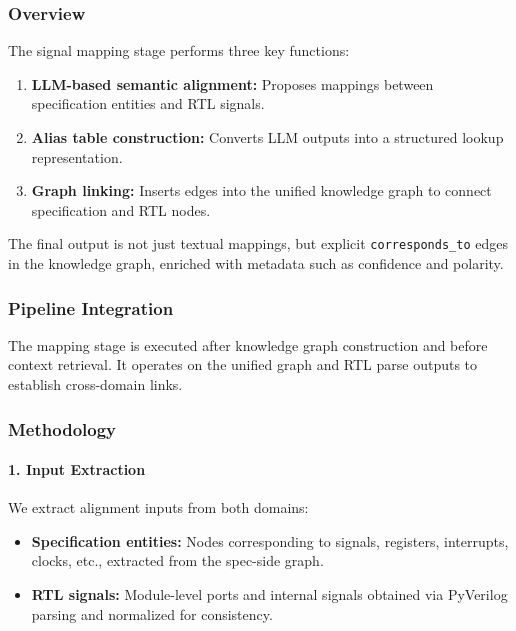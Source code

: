 \documentclass[12pt,a4paper]{article}
\begin{document}
\subsubsection{Overview}

The signal mapping stage performs three key functions:

\begin{enumerate}[leftmargin=*]
  \item \textbf{LLM-based semantic alignment:} Proposes mappings between
  specification entities and RTL signals.
  \item \textbf{Alias table construction:} Converts LLM outputs into a
  structured lookup representation.
  \item \textbf{Graph linking:} Inserts edges into the unified knowledge graph
  to connect specification and RTL nodes.
\end{enumerate}

The final output is not just textual mappings, but explicit
\texttt{corresponds\_to} edges in the knowledge graph, enriched with metadata
such as confidence and polarity.

\subsubsection{Pipeline Integration}

The mapping stage is executed after knowledge graph construction and before
context retrieval. It operates on the unified graph and RTL parse outputs to
establish cross-domain links.

\subsubsection{Methodology}

\paragraph{1. Input Extraction}

We extract alignment inputs from both domains:

\begin{itemize}[leftmargin=*]
  \item \textbf{Specification entities:} Nodes corresponding to signals,
  registers, interrupts, clocks, etc., extracted from the spec-side graph.
  \item \textbf{RTL signals:} Module-level ports and internal signals obtained
  via PyVerilog parsing and normalized for consistency.
\end{itemize}
\end{document}
